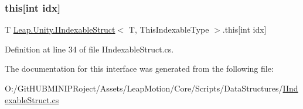 \subsubsection{\texorpdfstring{this[int idx]}{this[int idx]}}
{\footnotesize\ttfamily T \mbox{\hyperlink{interface_leap_1_1_unity_1_1_i_indexable_struct}{Leap.\+Unity.\+I\+Indexable\+Struct}}$<$ T, This\+Indexable\+Type $>$.this\mbox{[}int idx\mbox{]}\hspace{0.3cm}{\ttfamily [get]}}



Definition at line 34 of file I\+Indexable\+Struct.\+cs.



The documentation for this interface was generated from the following file\+:\begin{DoxyCompactItemize}
\item 
O\+:/\+Git\+H\+U\+B\+M\+I\+N\+I\+P\+Roject/\+Assets/\+Leap\+Motion/\+Core/\+Scripts/\+Data\+Structures/\mbox{\hyperlink{_i_indexable_struct_8cs}{I\+Indexable\+Struct.\+cs}}\end{DoxyCompactItemize}

